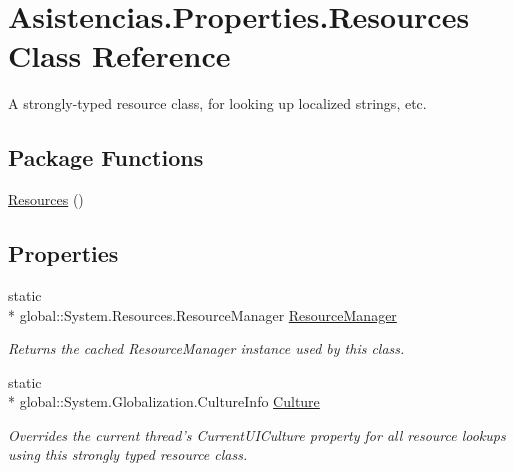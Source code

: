 \hypertarget{class_asistencias_1_1_properties_1_1_resources}{\section{Asistencias.\-Properties.\-Resources Class Reference}
\label{class_asistencias_1_1_properties_1_1_resources}
}


A strongly-\/typed resource class, for looking up localized strings, etc.  


\subsection*{Package Functions}
\begin{DoxyCompactItemize}
\item 
\hyperlink{class_asistencias_1_1_properties_1_1_resources_ab75c96bb7d0bdf7b0c5ab1011b7fd6ac}{Resources} ()
\end{DoxyCompactItemize}
\subsection*{Properties}
\begin{DoxyCompactItemize}
\item 
static \\*
global\-::\-System.\-Resources.\-Resource\-Manager \hyperlink{class_asistencias_1_1_properties_1_1_resources_a26dd1c170bed2b6e8577ff64c8e8fd9f}{Resource\-Manager}
\begin{DoxyCompactList}\small\item\em Returns the cached Resource\-Manager instance used by this class. \end{DoxyCompactList}\item 
static \\*
global\-::\-System.\-Globalization.\-Culture\-Info \hyperlink{class_asistencias_1_1_properties_1_1_resources_a1bc74ad8c5a5653ef56301173549a692}{Culture}
\begin{DoxyCompactList}\small\item\em Overrides the current thread's Current\-U\-I\-Culture property for all resource lookups using this strongly typed resource class. \end{DoxyCompactList}\end{DoxyCompactItemize}
